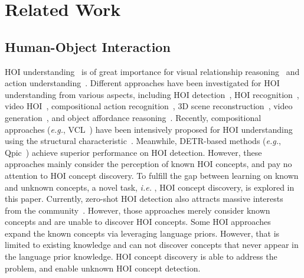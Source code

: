 \documentclass[runningheads]{llncs}
\newcommand{\ie}{\textit{i.e. }}
\newcommand{\eg}{\textit{e.g.}}
\begin{document}
\section{Related Work}

\subsection{Human-Object Interaction}
HOI understanding~\cite{gupta2009observing} is of great importance for visual relationship reasoning~\cite{xu2017scene} and action understanding~\cite{carreira2017quo,zheng2020skeleton}. Different approaches have been investigated for HOI understanding from various aspects, including HOI detection~\cite{chao2018learning,li2018transferable,liao2019ppdm,zhong2020polysemy,kim2021hotr,chen2021reformulating,zou2021end,tamura_cvpr2021,zhang2021mining}, HOI recognition~\cite{chaoy2015hico,kato2018compositional,huynh2021interaction}, video HOI~\cite{damen2018scaling1,ji2021detecting}, compositional action  recognition~\cite{materzynska2020something}, 3D scene reconstruction~\cite{zhang2020phosa,dabral2021gravity}, video generation~\cite{nawhal2020generating}, and object affordance reasoning~\cite{fang2018demo2vec,hou2021atl}. Recently, compositional approaches (\eg, VCL~\cite{hou2020visual}) have been intensively proposed for HOI understanding using the structural characteristic~\cite{kato2018compositional,hou2020visual,nawhal2020generating,li2020hoi,hou2021atl}. Meanwhile, DETR-based methods (\eg, Qpic~\cite{tamura_cvpr2021}) achieve superior performance on HOI detection. However, these approaches mainly consider the perception of known HOI concepts, and pay no attention to HOI concept discovery. To fulfill the gap between learning on known and unknown concepts, a novel task, \ie, HOI concept discovery, is explored in this paper. Currently, zero-shot HOI detection also attracts massive interests from the community~\cite{shen2018scaling,bansal2020detecting,preye2019detecting,hou2020visual,hou2021fcl}. However, those approaches merely consider known concepts and are unable to discover HOI concepts. Some HOI approaches~\cite{preye2019detecting,bansal2020detecting,wang2020discovering,wang2021discovering} expand the known concepts via leveraging language priors. However, that is limited to existing knowledge and can not discover concepts that never appear in the language prior knowledge. HOI concept discovery is able to address the problem, and enable unknown HOI concept detection.
\end{document}
